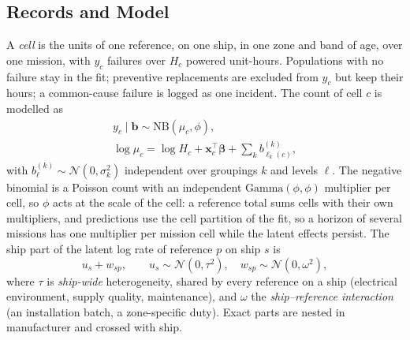 \subsection{Records and Model}
\label{sec:mechanisms}
A \emph{cell} is the units of one reference, on one ship, in one zone and band
of age, over one mission, with $y_c$ failures over $H_c$ powered unit-hours.
Populations with no failure stay in the fit; preventive replacements are
excluded from $y_c$ but keep their hours; a common-cause failure is logged as
one incident. The count of cell $c$ is modelled as
\begin{equation}
\begin{gathered}
y_c\mid\mathbf b\sim\mathrm{NB}(\mu_c,\phi),\\
\log\mu_c=\log H_c+\mathbf x_c^{\top}\boldsymbol\beta+\textstyle\sum_k b^{(k)}_{\ell_k(c)},
\end{gathered}
\label{eq:model}
\end{equation}
with $b^{(k)}_\ell\sim\mathcal N(0,\sigma_k^2)$ independent over groupings $k$
and levels $\ell$. The negative binomial is a Poisson count with an
independent $\mathrm{Gamma}(\phi,\phi)$ multiplier per cell, so $\phi$ acts at
the scale of the cell: a reference total sums cells with their own
multipliers, and predictions use the cell partition of the fit, so a horizon
of several missions has one multiplier per mission cell while the latent
effects persist. The ship part
of the latent log rate of reference $p$ on ship $s$ is
\begin{equation}
u_s+w_{sp},\qquad u_s\sim\mathcal N(0,\tau^2),\quad w_{sp}\sim\mathcal N(0,\omega^2),
\label{eq:structure}
\end{equation}
where $\tau$ is \emph{ship-wide} heterogeneity, shared by every reference on a
ship (electrical environment, supply quality, maintenance), and $\omega$ the
\emph{ship--reference interaction} (an installation batch, a zone-specific
duty). Exact parts are nested in manufacturer and crossed with ship.

